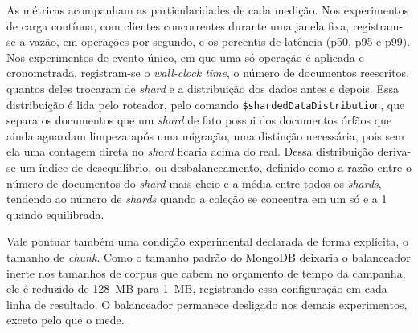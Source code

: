 As métricas acompanham as particularidades de cada medição. Nos experimentos de carga contínua, com clientes concorrentes durante uma janela fixa, registram-se a vazão, em operações por segundo, e os percentis de latência (p50, p95 e p99). Nos experimentos de evento único, em que uma só operação é aplicada e cronometrada, registram-se o \textit{wall-clock time}, o número de documentos reescritos, quantos deles trocaram de \textit{shard} e a distribuição dos dados antes e depois. Essa distribuição é lida pelo roteador, pelo comando \texttt{\$shardedDataDistribution}, que separa os documentos que um \textit{shard} de fato possui dos documentos órfãos que ainda aguardam limpeza após uma migração, uma distinção necessária, pois sem ela uma contagem direta no \textit{shard} ficaria acima do real. Dessa distribuição deriva-se um índice de desequilíbrio, ou desbalanceamento, definido como a razão entre o número de documentos do \textit{shard} mais cheio e a média entre todos os \textit{shards}, tendendo ao número de \textit{shards} quando a coleção se concentra em um só e a 1 quando equilibrada.

Vale pontuar também uma condição experimental declarada de forma explícita, o tamanho de \textit{chunk}. Como o tamanho padrão do MongoDB deixaria o balanceador inerte nos tamanhos de corpus que cabem no orçamento de tempo da campanha, ele é reduzido de 128~MB para 1~MB, registrando essa configuração em cada linha de resultado. O balanceador permanece desligado nos demais experimentos, exceto pelo que o mede.